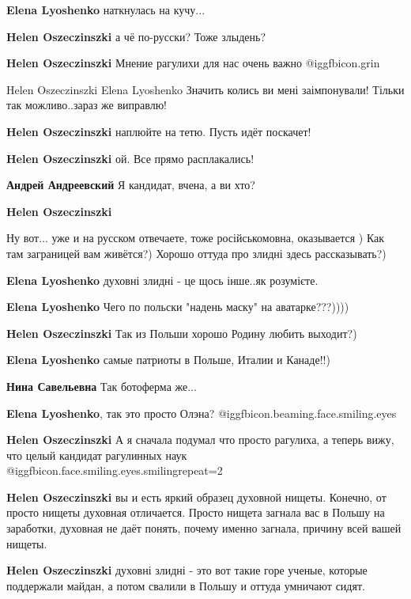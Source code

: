 \begin{itemize}
\begin{itemize}
\textbf{Elena Lyoshenko} наткнулась на кучу...

\textbf{Helen Oszeczinszki} а чё по-русски? Тоже злыдень?

\textbf{Helen Oszeczinszki}
Мнение рагулихи для нас очень важно  @igg{fbicon.grin} 

Helen Oszeczinszki
Elena Lyoshenko Значить колись ви мені заімпонували! Тільки так можливо..зараз же виправлю!

\textbf{Helen Oszeczinszki} наплюйте на тетю. Пусть идёт поскачет!

\textbf{Helen Oszeczinszki} ой. Все прямо расплакались!

\textbf{Андрей Андреевский} Я кандидат, вчена, а ви хто?

\textbf{Helen Oszeczinszki}

Ну вот... уже и на русском отвечаете, тоже російськомовна, оказывается ) Как
там заграницей вам живётся?) Хорошо оттуда про злидні здесь рассказывать?)

\textbf{Elena Lyoshenko} духовні злидні - це щось інше..як розумієте.

\textbf{Elena Lyoshenko} Чего по польски "надень маску" на аватарке???))))

\textbf{Helen Oszeczinszki}
Так из Польши хорошо Родину любить выходит?)

\textbf{Elena Lyoshenko} самые патриоты в Польше, Италии и Канаде!!)

\textbf{Нина Савельевна}
Так ботоферма же...

\textbf{Elena Lyoshenko}, так это просто Олэна?  @igg{fbicon.beaming.face.smiling.eyes} 

\textbf{Helen Oszeczinszki}
А я сначала подумал что просто рагулиха, а теперь вижу, что целый кандидат рагулинных наук  @igg{fbicon.face.smiling.eyes.smiling}{repeat=2} 

\textbf{Helen Oszeczinszki} вы и есть яркий образец духовной нищеты. Конечно, от просто нищеты духовная отличается. Просто нищета загнала вас в Польшу на заработки, духовная не даёт понять, почему именно загнала, причину всей вашей нищеты.

\textbf{Helen Oszeczinszki}
духовні злидні - это вот такие горе ученые, которые поддержали майдан, а потом свалили в Польшу и оттуда умничают сидят.


\end{itemize}
\end{itemize}
